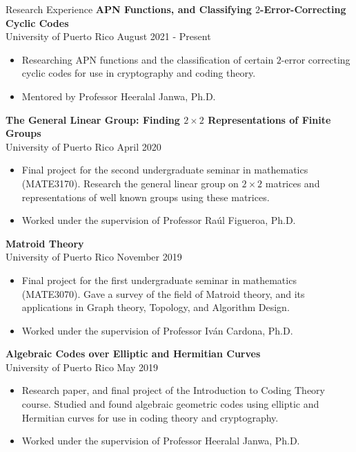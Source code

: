 \documentclass{resume} %
\begin{document}
\begin{rSection}{Research Experience}
    \textbf{APN Functions, and Classifying $2$-Error-Correcting Cyclic Codes} \\
    University of Puerto Rico \hfill{August 2021 - Present}
    \begin{itemize}
        \item Researching APN functions and the classification of certain
            $2$-error correcting cyclic codes for use in cryptography and coding
            theory.

        \item Mentored by Professor Heeralal Janwa, Ph.D.
    \end{itemize}

    \textbf{The General Linear Group: Finding $2 \times 2$
    Representations of Finite Groups} \\
    University of Puerto Rico \hfill{April 2020}
    \begin{itemize}
        \item Final project for the second undergraduate seminar in mathematics
            (MATE3170). Research the general linear group on $2 \times 2$
            matrices and representations of well known groups using these
            matrices.

        \item Worked under the supervision of Professor Ra\'ul Figueroa, Ph.D.
    \end{itemize}

    \textbf{Matroid Theory}  \\
    University of Puerto Rico \hfill{November 2019}
    \begin{itemize}
        \item Final project for the first undergraduate seminar in mathematics
            (MATE3070). Gave a survey of the field of Matroid theory, and its
            applications in Graph theory, Topology, and Algorithm Design.

        \item Worked under the supervision of Professor Iv\'an Cardona, Ph.D.
    \end{itemize}

    \textbf{Algebraic Codes over Elliptic and Hermitian
    Curves} \\
    University of Puerto Rico \hfill{May 2019}
    \begin{itemize}
        \item Research paper, and final project of the Introduction to Coding
            Theory course. Studied and found algebraic geometric codes using
            elliptic and Hermitian curves for use in coding theory and
            cryptography.

        \item Worked under the supervision of Professor Heeralal Janwa, Ph.D.
    \end{itemize}
\end{rSection}
\end{document}
